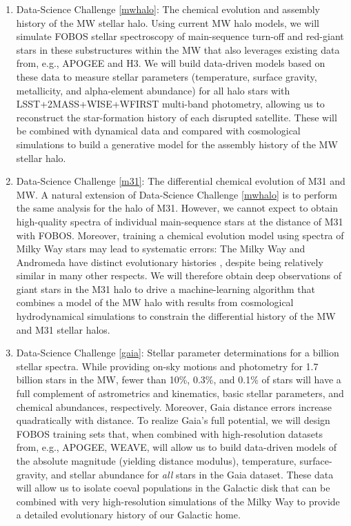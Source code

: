 \documentclass[oneside,11pt]{amsart}
\newcounter{chalno}
\newcommand{\chal}[1]{\refstepcounter{chalno}\label{#1}}
\begin{document}
\begin{enumerate}[rightmargin=0.2cm,leftmargin=0.2cm]

\chal{mwhalo} 
%
\item[] {\textsf {\large  Data-Science Challenge \ref{mwhalo}: The
chemical evolution and assembly history of the MW stellar halo.}}  Using current MW halo models, we will simulate FOBOS
stellar spectroscopy of main-sequence turn-off
and red-giant stars in these substructures within the MW that also
leverages existing data from, e.g., APOGEE and H3.  We will build
data-driven models based on these data to measure stellar parameters
(temperature, surface gravity, metallicity, and alpha-element abundance)
for all halo stars with LSST+2MASS+WISE+WFIRST multi-band photometry,
allowing us to reconstruct the star-formation history of each disrupted
satellite. These will be combined with dynamical data and compared with
cosmological simulations to build a generative model for the assembly
history of the MW stellar halo.

\chal{m31} 
%
\item[] {\textsf {\large Data-Science Challenge \ref{m31}: The
differential chemical evolution of M31 and MW.}}  A natural extension of
Data-Science Challenge \ref{mwhalo} is to perform the same analysis for the
halo of M31.  However, we cannot expect to obtain high-quality spectra
of individual main-sequence stars at the distance of M31 with FOBOS.
Moreover, training a chemical evolution model using spectra of Milky Way
stars may lead to systematic errors:  The Milky Way and Andromeda have
distinct evolutionary histories \citep[e.g.][]{2005MNRAS.356.1071R},
despite being relatively similar in many other respects.  We will
therefore obtain deep observations of giant stars in the M31 halo to
drive a machine-learning algorithm that combines a model of the MW halo
with results from cosmological hydrodynamical simulations to constrain
the differential history of the MW and M31 stellar halos.

\chal{gaia} 
%
\item[] {\textsf {\large Data-Science Challenge \ref{gaia}: Stellar
parameter determinations for a billion stellar spectra.}} While
providing on-sky motions and photometry for 1.7 billion stars in the MW,
fewer than 10\%, 0.3\%, and 0.1\% of stars will have a full complement
of astrometrics and kinematics, basic stellar parameters, and chemical
abundances, respectively.  Moreover, Gaia distance errors increase
quadratically with distance.  To realize Gaia's full potential, we will
design FOBOS training sets that, when combined with high-resolution
datasets from, e.g., APOGEE, WEAVE, will allow us to build data-driven
models of the absolute magnitude (yielding distance modulus),
temperature, surface-gravity, and stellar abundance for {\it all} stars
in the Gaia dataset.  These data will allow us to isolate coeval
populations in the Galactic disk that can be combined with very
high-resolution simulations of the Milky Way to provide a detailed
evolutionary history of our Galactic home.

\end{enumerate}
\end{document}
